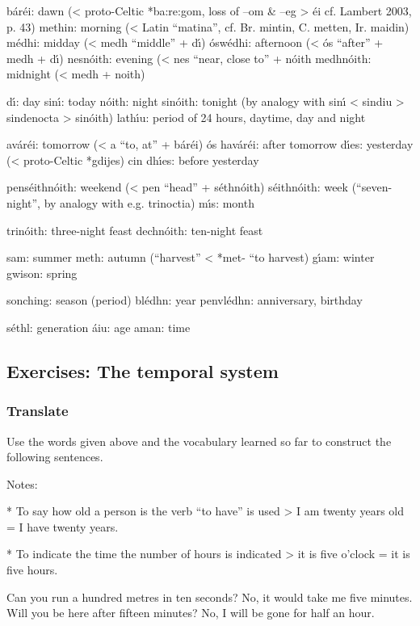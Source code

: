 b\'{a}r\'{e}i: dawn (< proto-Celtic *ba:re:gom, loss of –om \& –eg > \'{e}i cf. Lambert 2003, p. 43)
methin: morning (< Latin “matina”, cf. Br. mintin, C. metten, Ir. maidin)
m\'{e}dhi: midday (< medh “middle” + d\'{\i})
\'{o}sw\'{e}dhi: afternoon (< \'{o}s “after” + medh + d\'{\i})
nesn\'{o}ith: evening (< nes “near, close to” + n\'{o}ith
medhn\'{o}ith: midnight (< medh + noith)

d\'{\i}: day
sin\'{\i}: today
n\'{o}ith: night
sin\'{o}ith: tonight (by analogy with sin\'{\i} < sindiu > sindenocta > sin\'{o}ith)
lath\'{\i}u: period of 24 hours, daytime, day and night

av\'{a}r\'{e}i: tomorrow (< a “to, at” + b\'{a}r\'{e}i)
\'{o}s hav\'{a}r\'{e}i: after tomorrow
d\'{\i}es: yesterday (< proto-Celtic *gdijes)
cin dh\'{\i}es: before yesterday

pens\'{e}ithn\'{o}ith: weekend (< pen “head” + s\'{e}thn\'{o}ith)
s\'{e}ithn\'{o}ith: week (“seven-night”, by analogy with e.g. trinoctia)
m\'{\i}s: month

trin\'{o}ith: three-night feast
dechn\'{o}ith: ten-night feast

sam: summer
meth: autumn (“harvest” < *met- “to harvest)
g\'{\i}am: winter
gwison: spring

sonching: season (period)
bl\'{e}dhn: year
penvl\'{e}dhn: anniversary, birthday

s\'{e}thl: generation
\'{a}iu: age
aman: time

\subsection{Exercises: The temporal system}

\subsubsection{Translate}

Use the words given above and the vocabulary learned so far to construct the following sentences.

Notes: 

* To say how old a person is the verb “to have” is used > I am twenty years old = I have twenty years. 

* To indicate the time the number of hours is indicated > it is five o’clock = it is five hours.

Can you run a hundred metres in ten seconds?
No, it would take me five minutes.
Will you be here after fifteen minutes?
No, I will be gone for half an hour.

